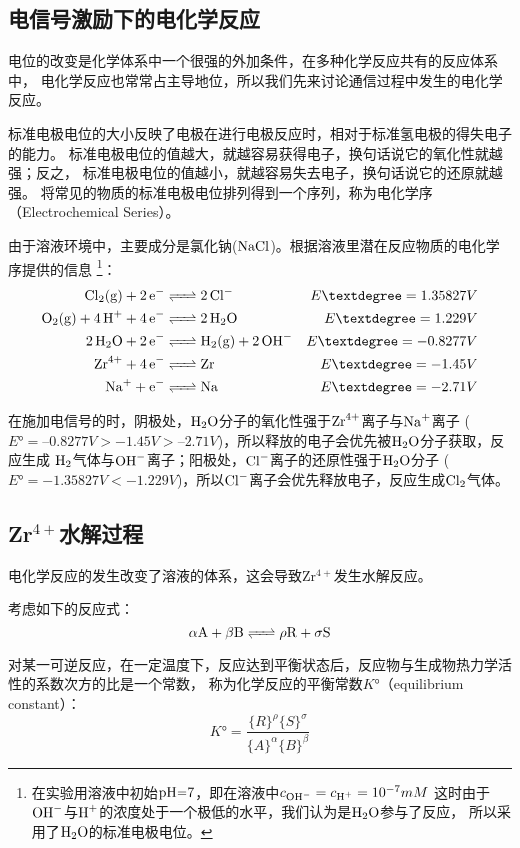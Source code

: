 \subsection{电信号激励下的电化学反应}
电位的改变是化学体系中一个很强的外加条件，在多种化学反应共有的反应体系中，
电化学反应也常常占主导地位，所以我们先来讨论通信过程中发生的电化学反应。

标准电极电位的大小反映了电极在进行电极反应时，相对于标准氢电极的得失电子的能力。
标准电极电位的值越大，就越容易获得电子，换句话说它的氧化性就越强；反之，
标准电极电位的值越小，就越容易失去电子，换句话说它的还原就越强\cite{Trasatti1980}。
将常见的物质的标准电极电位排列得到一个序列，称为电化学序（Electrochemical Series）。

由于溶液环境中，主要成分是氯化钠($\ce{NaCl}$)。根据溶液里潜在反应物质的电化学序提供的信息\cite{Weik2001}
\footnote{在实验用溶液中初始$\ce{pH=7}$，即在溶液中$c_{\ce{OH-}}=c_{\ce{H+}}=10^{-7}mM$
这时由于$\ce{OH-}$与$\ce{H+}$的浓度处于一个极低的水平，我们认为是$\ce{H2O}$参与了反应，
所以采用了$\ce{H2O}$的标准电极电位。}：
\begin{align}
\label{equation:anode_reaction} \ce{Cl2(g) + 2e- &<=> 2 Cl-} \quad\quad\quad\quad &{E°}=1.35827V \\
\ce{O2(g) + 4H+ + 4 e- &<=> 2H2O} &{E°}=1.229V \\ 
\label{equation:cathode_reaction} \ce{2 H2O + 2 e- &<=> H2(g) + 2OH- } &{E°}=-0.8277V \\
\ce{Zr^4+ + 4e- &<=> Zr}   &{E°}=-1.45V \\
\ce{Na+ + e- &<=> Na }     &{E°}=-2.71V
\end{align}


在施加电信号的时，阴极处，$\ce{H2O}$分子的氧化性强于$\ce{Zr^4+}$离子与$\ce{Na+}$离子
($E°=–0.8277V>-1.45V>–2.71V$)，所以释放的电子会优先被$\ce{H2O}$分子获取，反应生成
$\ce{H2}$气体与$\ce{OH-}$离子；阳极处，$\ce{Cl-}$离子的还原性强于$\ce{H2O}$分子
($E°=-1.35827V<-1.229V$)，所以$\ce{Cl-}$离子会优先释放电子，反应生成$\ce{Cl2}$气体。

\subsection{Zr$^{4+}$水解过程}
电化学反应的发生改变了溶液的体系，这会导致Zr$^{4+}$发生水解反应。

考虑如下的反应式：
\begin{equation}
    \ce{\alpha{A} +\beta{B} <=> \rho{R} + \sigma{S}}
\end{equation}

对某一可逆反应，在一定温度下，反应达到平衡状态后，反应物与生成物热力学活性的系数次方的比是一个常数，
称为化学反应的平衡常数$K°$（equilibrium constant）：
\begin{equation}
    K°=\frac{\{R\}^\rho \{S\}^\sigma}{\{A\}^\alpha \{B\}^\beta}
\end{equation}

